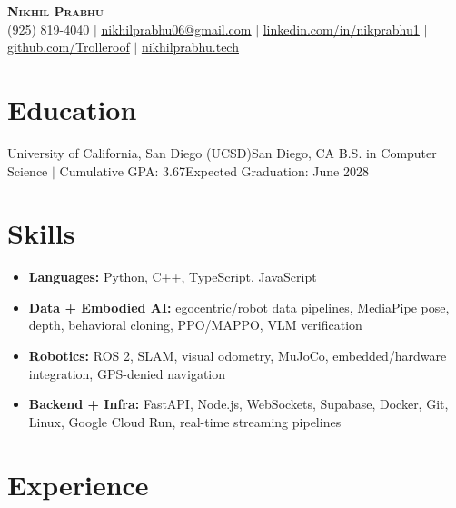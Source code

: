 




\begin{center}
    \textbf{\Large \scshape Nikhil Prabhu} \\ \vspace{1pt}
    \small (925) 819-4040 $|$ \href{mailto:nikhilprabhu06@gmail.com}{\underline{nikhilprabhu06@gmail.com}} $|$ 
    \href{https://www.linkedin.com/in/nikprabhu1/}{\underline{linkedin.com/in/nikprabhu1}} $|$
    \href{https://github.com/Trolleroof}{\underline{github.com/Trolleroof}} $|$
    \href{https://nikhilprabhu.tech}{\underline{nikhilprabhu.tech}}
\end{center}
\small

\section{Education}
  \resumeSubHeadingListStart
    \resumeSubheading
      {University of California, San Diego (UCSD)}{San Diego, CA}
      {B.S. in Computer Science $|$ Cumulative GPA: 3.67}{Expected Graduation: June 2028}
  \resumeSubHeadingListEnd
\vspace{-4pt}

\section{Skills}
\begin{itemize}[leftmargin=0.15in, label={}, nosep, topsep=2pt, itemsep=3pt, parsep=0pt]
  \item \textbf{Languages:} Python, C++, TypeScript, JavaScript
  \item \textbf{Data + Embodied AI:} egocentric/robot data pipelines, MediaPipe pose, depth, behavioral cloning, PPO/MAPPO, VLM verification
  \item \textbf{Robotics:} ROS 2, SLAM, visual odometry, MuJoCo, embedded/hardware integration, GPS-denied navigation
  \item \textbf{Backend + Infra:} FastAPI, Node.js, WebSockets, Supabase, Docker, Git, Linux, Google Cloud Run, real-time streaming pipelines
\end{itemize}
\vspace{-4pt}

\section{Experience}
  \resumeSubHeadingListStart

